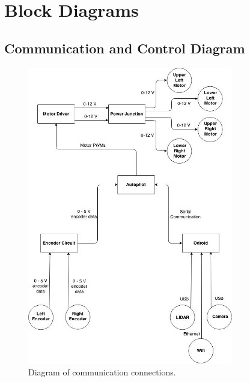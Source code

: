 \documentclass[letterpaper,12pt]{report}
\begin{document}
\chapter{Block Diagrams}
\section{Communication and Control Diagram}
\begin{figure}[h]
	\centering
	\includegraphics[width=0.8\textwidth]{commdiag.jpg}
	\caption{Diagram of communication connections.}
	\label{Figure 1:}
\end{figure}
\end{document}
